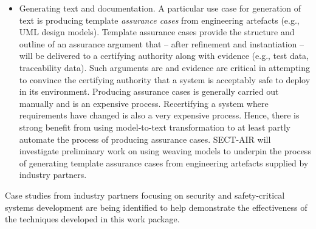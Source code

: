 \begin{itemize}
\item Generating text and documentation. A particular use case for generation of text is producing
template \textit{assurance cases} from engineering artefacts (e.g., UML design models). Template assurance cases provide the structure and outline of an assurance
argument that -- after refinement and instantiation -- will be delivered to a certifying authority along with evidence (e.g., test data, traceability data). Such arguments are
and evidence are critical in attempting to convince the certifying authority that a system is acceptably safe to deploy in its environment. Producing assurance cases is
generally carried out manually and is an expensive process. Recertifying a system where requirements have changed is also a very expensive process. Hence, there is strong
benefit from  using model-to-text transformation to at least partly automate the process of producing assurance cases. SECT-AIR will investigate preliminary work on using weaving models \cite{HawkinsHKPK15} to underpin the process of generating template assurance cases from engineering artefacts supplied by industry partners.
\end{itemize}

Case studies from industry partners focusing on security and safety-critical systems development are being identified to help demonstrate the effectiveness
of the techniques developed in this work package.



